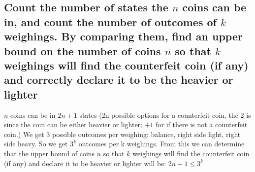 \documentclass[11pt, oneside]{book}   	%
\begin{document}
\subsection{Count the number of states the $n$ coins can be in, and count the number of outcomes of $k$ weighings.  By comparing them, find an upper bound on the number of coins $n$ so that $k$ weighings will find the counterfeit coin (if any) and correctly declare it to be the heavier or lighter}
$n$ coins can be in $2n+1$ states (2n possible options for a counterfeit coin, the 2 is since the coin can be either heavier or lighter; $+1$ for if there is not a counterfeit coin.)  We get 3 possible outcomes per weighing: balance, right side light, right side heavy.  So we get $3^k$ outcomes per k weighings.  From this we can determine that the upper bound of coins $n$ so that $k$ weighings will find the counterfeit coin (if any) and declare it to be heavier or lighter will be: $2n+1 \leq 3^k$
\end{document}
